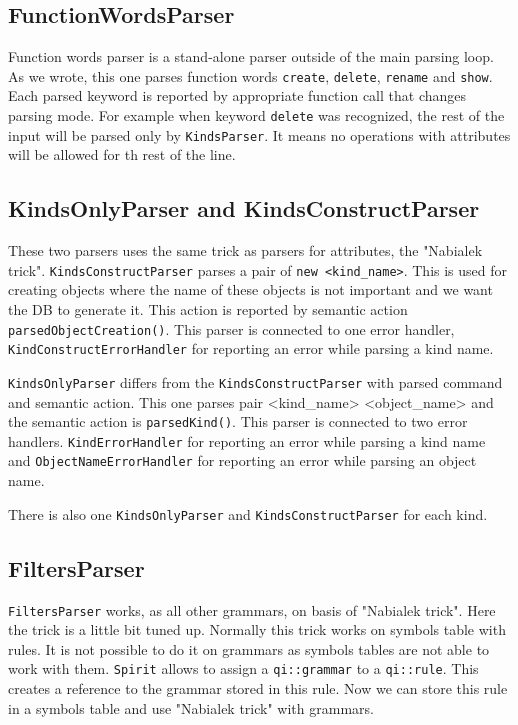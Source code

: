 \documentclass[deska]{subfiles}
\begin{document}
\subsection{FunctionWordsParser}

Function words parser is a stand-alone parser outside of the main parsing loop. As we wrote, this one parses function words
{\tt create}, {\tt delete}, {\tt rename} and {\tt show}. Each parsed keyword is reported by appropriate function call that changes parsing mode.
For example when keyword {\tt delete} was recognized, the rest of the input will be parsed only by {\tt KindsParser}. It means
no operations with attributes will be allowed for th rest of the line.

\subsection{KindsOnlyParser and KindsConstructParser}

These two parsers uses the same trick as parsers for attributes, the "Nabialek trick". {\tt KindsConstructParser} parses
a pair of {\tt new <kind\_name>}. This is used for creating objects where the name of these objects is not important and we
want the DB to generate it. This action is reported by semantic action {\tt parsedObjectCreation()}. This parser is connected
to one error handler, {\tt KindConstructErrorHandler} for reporting an error while parsing a kind name.

{\tt KindsOnlyParser} differs from the {\tt KindsConstructParser} with parsed command and semantic action. This one parses
pair <kind\_name> <object\_name> and the semantic action is {\tt parsedKind()}. This parser is connected to two error handlers.
{\tt KindErrorHandler} for reporting an error while parsing a kind name and {\tt ObjectNameErrorHandler} for reporting an
error while parsing an object name.

There is also one {\tt KindsOnlyParser} and {\tt KindsConstructParser} for each kind. 

\subsection{FiltersParser}

{\tt FiltersParser} works, as all other grammars, on basis of "Nabialek trick". Here the trick is a little bit tuned up.
Normally this trick works on symbols table with rules. It is not possible to do it on grammars as symbols tables are not
able to work with them. {\tt Spirit} allows to assign a {\tt qi::grammar} to a {\tt qi::rule}. This creates a reference
to the grammar stored in this rule. Now we can store this rule in a symbols table and use "Nabialek trick" with grammars.
\end{document}
